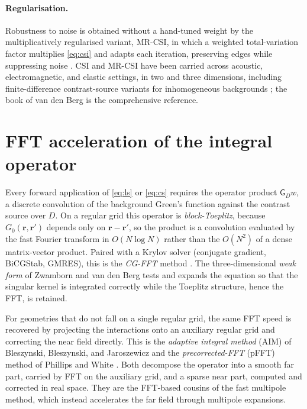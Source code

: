 \documentclass[11pt,a4paper]{article}
\newcommand{\vr}{\mathbf{r}}
\newcommand{\Gop}{\mathsf{G}}
\begin{document}
\paragraph{Regularisation.} Robustness to noise is obtained without a hand-tuned weight by the
multiplicatively regularised variant, MR-CSI, in which a weighted total-variation factor
multiplies \eqref{eq:csi} and adapts each iteration, preserving edges while suppressing noise
\cite{AbubakarvdBMallorqui2002}. CSI and MR-CSI have been carried across acoustic,
electromagnetic, and elastic settings, in two and three dimensions, including finite-difference
contrast-source variants for inhomogeneous backgrounds \cite{AbubakarHuvdBHabashy2008}; the
book of van den Berg \cite{vdB2021} is the comprehensive reference.

\section{FFT acceleration of the integral operator}

Every forward application of \eqref{eq:ls} or \eqref{eq:cs} requires the operator product
$\Gop_D w$, a discrete convolution of the background Green's function against the contrast
source over $D$. On a regular grid this operator is \emph{block-Toeplitz}, because
$G_0(\vr,\vr')$ depends only on $\vr-\vr'$, so the product is a convolution evaluated by the
fast Fourier transform in $O(N\log N)$ rather than the $O(N^2)$ of a dense matrix-vector
product. Paired with a Krylov solver (conjugate gradient, BiCGStab, GMRES), this is the
\emph{CG-FFT} method \cite{SarkarArvasRao1986}. The three-dimensional \emph{weak form} of
Zwamborn and van den Berg \cite{ZwambornvdB1992} tests and expands the equation so that the
singular kernel is integrated correctly while the Toeplitz structure, hence the FFT, is
retained.

For geometries that do not fall on a single regular grid, the same FFT speed is recovered by
projecting the interactions onto an auxiliary regular grid and correcting the near field
directly. This is the \emph{adaptive integral method} (AIM) of Bleszynski, Bleszynski, and
Jaroszewicz \cite{BleszynskiAIM1996} and the \emph{precorrected-FFT} (pFFT) method of Phillips
and White \cite{PhillipsWhite1997}. Both decompose the operator into a smooth far part, carried
by FFT on the auxiliary grid, and a sparse near part, computed and corrected in real space.
They are the FFT-based cousins of the fast multipole method, which instead accelerates the far
field through multipole expansions.
\end{document}

